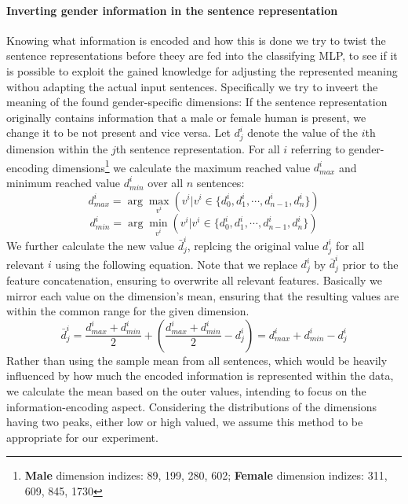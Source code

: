 \paragraph*{Inverting gender information in the sentence representation}
Knowing what information is encoded and how this is done we try to twist the sentence representations before theey are fed into the classifying \ac{MLP}, to see if it is possible to exploit the gained knowledge for adjusting the represented meaning withou adapting the actual input sentences. Specifically we try to inveert the meaning of the found gender-specific dimensions: If the sentence representation originally contains information that a male or female human is present, we change it to be not present and vice versa. Let $d^i_j$ denote the value of the $i$th dimension within the $j$th sentence representation. For all $i$ referring to gender-encoding dimensions\footnote{\textbf{Male} dimension indizes: 89, 199, 280, 602; \textbf{Female} dimension indizes: 311, 609, 845, 1730} we calculate the maximum reached value $d^i_{max}$ and minimum reached value $d^i_{min}$ over all $n$ sentences:
\begin{equation}
d^i_{max} = \arg\max_{v^i}(v^i | v^i \in \{d^i_0, d^i_1, \cdots,d^i_{n-1}, d^i_n\})
\end{equation}
\begin{equation}
d^i_{min} = \arg\min_{v^i}(v^i | v^i \in \{d^i_0, d^i_1, \cdots,d^i_{n-1}, d^i_n\})
\end{equation}
We further calculate the new value $\bar{d}^i_j$, replcing the original value $d^i_j$ for all relevant $i$ using the following equation. Note that we replace $d^i_j$ by $\bar{d}^i_j$ prior to the feature concatenation, ensuring to overwrite all relevant features. Basically we mirror each value on the dimension's mean, ensuring that the resulting values are within the common range for the given dimension.
\begin{equation}\label{eq:invert}
\bar{d}^i_j = \frac{d^i_{max} + d^i_{min}}{2} + \left(\frac{d^i_{max} + d^i_{min}}{2} - d^i_j\right) = d^i_{max} + d^i_{min} - d^i_j
\end{equation}
Rather than using the sample mean from all sentences, which would be heavily influenced by how much the encoded information is represented within the data, we calculate the mean based on the outer values, intending to focus on the information-encoding aspect. Considering the distributions of the dimensions having two peaks, either low or high valued, we assume this method to be appropriate for our experiment.

